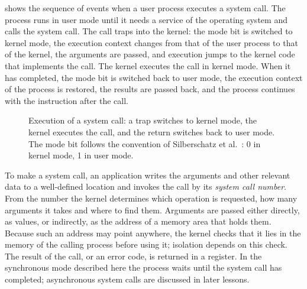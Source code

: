 \documentclass[../main.tex]{subfiles}
\begin{document}
 shows the sequence of events when a user
process executes a system call.  The process runs in user mode
until it needs a service of the operating system and calls the system call.
The call traps into the kernel: the mode bit is switched to kernel mode,
the execution context changes from that of the user process to that of the
kernel, the arguments are passed, and execution jumps to the kernel code
that implements the call.  The kernel executes the call in kernel mode.
When it has completed, the mode bit is switched back to user mode, the
execution context of the process is restored, the results are passed back,
and the process continues with the instruction after the call.

\begin{figure}[htbp]
  \centering
  
  \caption{Execution of a system call: a trap switches to kernel mode, the
    kernel executes the call, and the return switches back to user mode.
    The mode bit follows the convention of Silberschatz et al.\
    \cite{silberschatz2018}: 0 in kernel mode, 1 in user mode.}
  \label{fig:l01-syscall-flow}
\end{figure}

To make a system call, an application writes the arguments and other
relevant data to a well-defined location and invokes the call by its
\emph{system call number}.  From the number the kernel determines which
operation is requested, how many arguments it takes and where to find
them.  Arguments are passed either directly, as values, or indirectly, as
the address of a memory area that holds them.  Because such an address
may point anywhere, the kernel checks that it lies in the memory of the
calling process before using it; isolation depends on this check.  The
result of the call, or an error code, is returned in a register.  In the
synchronous mode
described here the process waits until the system call has completed;
asynchronous system calls are discussed in later lessons.
\end{document}
